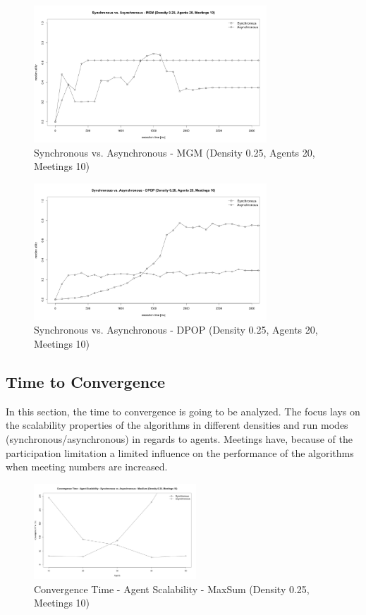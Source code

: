 \begin{figure}[H]
\centering
\includegraphics[width=330px]{graphics/experiments/static/st_12b}
\caption{Synchronous vs. Asynchronous - MGM (Density 0.25, Agents 20, Meetings 10)}
\label{fig:st_12b}
\end{figure}
\begin{figure}[H]
\centering
\includegraphics[width=330px]{graphics/experiments/static/st_13}
\caption{Synchronous vs. Asynchronous - DPOP (Density 0.25, Agents 20, Meetings 10)}
\label{fig:st_13}
\end{figure}


\subsection{Time to Convergence}

In this section, the time to convergence is going to be analyzed. The focus lays on the scalability properties of the algorithms in different densities and run modes (synchronous/asynchronous) in regards to agents. Meetings have, because of the participation limitation a limited influence on the performance of the algorithms when meeting numbers are increased. 

\begin{figure}[H]
\centering
\includegraphics[width=230px]{graphics/experiments/static/st_14}
\caption{Convergence Time - Agent Scalability - MaxSum (Density 0.25, Meetings 10)}
\label{fig:st_14}
\end{figure}

